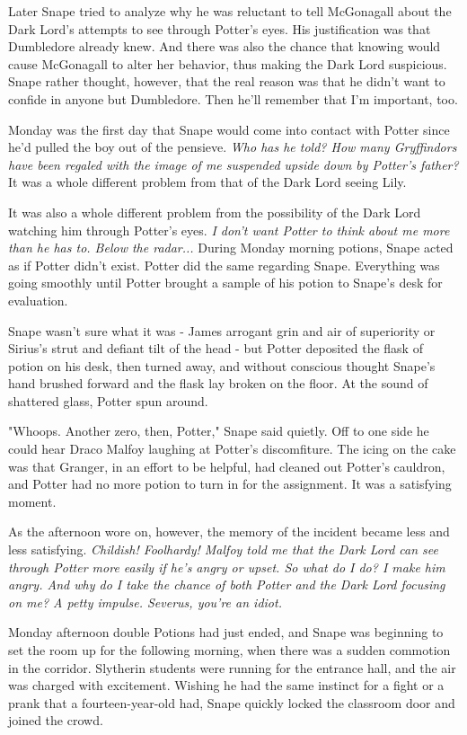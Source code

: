 \documentclass[a4paper,11pt]{article}
\begin{document}
Later Snape tried to analyze why he was reluctant to tell McGonagall about the Dark Lord's attempts to see through Potter's eyes. His justification was that Dumbledore already knew. And there was also the chance that knowing would cause McGonagall to alter her behavior, thus making the Dark Lord suspicious. Snape rather thought, however, that the real reason was that he didn't want to confide in anyone but Dumbledore. Then he'll remember that I'm important, too.

Monday was the first day that Snape would come into contact with Potter since he'd pulled the boy out of the pensieve. \emph{Who has he told? How many Gryffindors have been regaled with the image of me suspended upside down by Potter's father?} It was a whole different problem from that of the Dark Lord seeing Lily.

It was also a whole different problem from the possibility of the Dark Lord watching him through Potter's eyes. \emph{I don't want Potter to think about me more than he has to. Below the radar...} During Monday morning potions, Snape acted as if Potter didn't exist. Potter did the same regarding Snape. Everything was going smoothly until Potter brought a sample of his potion to Snape's desk for evaluation.

Snape wasn't sure what it was - James arrogant grin and air of superiority or Sirius's strut and defiant tilt of the head - but Potter deposited the flask of potion on his desk, then turned away, and without conscious thought Snape's hand brushed forward and the flask lay broken on the floor. At the sound of shattered glass, Potter spun around.

"Whoops. Another zero, then, Potter," Snape said quietly. Off to one side he could hear Draco Malfoy laughing at Potter's discomfiture. The icing on the cake was that Granger, in an effort to be helpful, had cleaned out Potter's cauldron, and Potter had no more potion to turn in for the assignment. It was a satisfying moment.

As the afternoon wore on, however, the memory of the incident became less and less satisfying. \emph{Childish! Foolhardy! Malfoy told me that the Dark Lord can see through Potter more easily if he's angry or upset. So what do I do? I make him angry. And why do I take the chance of both Potter and the Dark Lord focusing on me? A petty impulse. Severus, you're an idiot.}

Monday afternoon double Potions had just ended, and Snape was beginning to set the room up for the following morning, when there was a sudden commotion in the corridor. Slytherin students were running for the entrance hall, and the air was charged with excitement. Wishing he had the same instinct for a fight or a prank that a fourteen-year-old had, Snape quickly locked the classroom door and joined the crowd.
\end{document}
